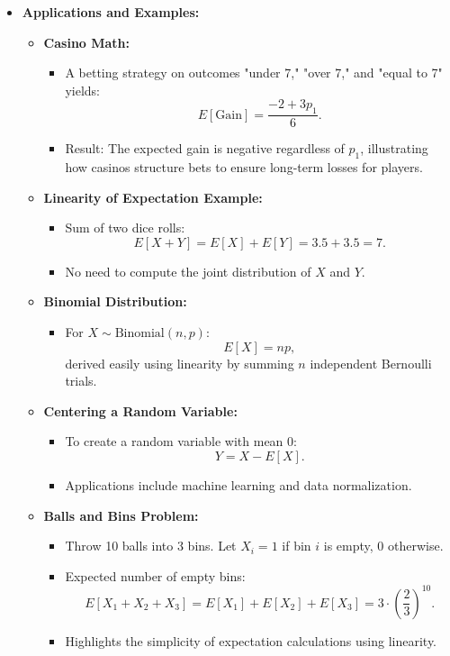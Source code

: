 \documentclass{article}
\begin{document}
\begin{itemize}
  \item \textbf{Applications and Examples:}
    \begin{itemize}
      \item \textbf{Casino Math:}
        \begin{itemize}
          \item A betting strategy on outcomes "under 7," "over 7," and "equal to 7" yields:
            \[
              E[\text{Gain}] = \frac{-2 + 3p_1}{6}.
            \]
          \item Result: The expected gain is negative regardless of $p_1$, illustrating how casinos structure bets to ensure long-term losses for players.
        \end{itemize}

      \item \textbf{Linearity of Expectation Example:}
        \begin{itemize}
          \item Sum of two dice rolls:
            \[
              E[X + Y] = E[X] + E[Y] = 3.5 + 3.5 = 7.
            \]
          \item No need to compute the joint distribution of $X$ and $Y$.
        \end{itemize}

      \item \textbf{Binomial Distribution:}
        \begin{itemize}
          \item For $X \sim \text{Binomial}(n, p)$:
            \[
              E[X] = np,
            \]
            derived easily using linearity by summing $n$ independent Bernoulli trials.
        \end{itemize}

      \item \textbf{Centering a Random Variable:}
        \begin{itemize}
          \item To create a random variable with mean 0:
            \[
              Y = X - E[X].
            \]
          \item Applications include machine learning and data normalization.
        \end{itemize}

      \item \textbf{Balls and Bins Problem:}
        \begin{itemize}
          \item Throw 10 balls into 3 bins. Let $X_i = 1$ if bin $i$ is empty, $0$ otherwise.
          \item Expected number of empty bins:
            \[
              E[X_1 + X_2 + X_3] = E[X_1] + E[X_2] + E[X_3] = 3 \cdot \left(\frac{2}{3}\right)^{10}.
            \]
          \item Highlights the simplicity of expectation calculations using linearity.
        \end{itemize}
    \end{itemize}
\end{itemize}
\end{document}
